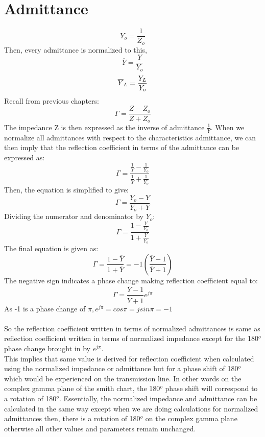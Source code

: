 \section{Admittance}
\begin{equation}
Y_o= \frac{1}{Z_o}
\end{equation}
Then, every admittance is normalized to this,
\begin{equation*}
\overline{Y} = \frac{Y}{Y_o} 
\end{equation*}
\begin{equation*}
\space  \overline{Y}_L = \frac{Y_L}{Y_o}
\end{equation*}
Recall from previous chapters:
\begin{equation*}
\Gamma = \frac{Z-Z_o}{Z+Z_o} 
\end{equation*}
The impedance Z is then expressed as the inverse of admittance $\frac{1}{Y}$. When we normalize all admittances with respect to the characteristics admittance, we can then imply that the reflection coefficient in terms of the admittance can be expressed as:
\begin{equation*}
\Gamma = \frac{\frac{1}{Y} - \frac{1}{Y_o}}{\frac{1}{Y} + \frac{1}{Y_o}}
\end{equation*}
Then, the equation is simplified to give:
\begin{equation}
\Gamma= \frac{Y_o - Y}{Y_o + Y} 
\end{equation}
Dividing the numerator and denominator by $Y_o$:
\begin{equation*}
\Gamma= \frac{1 - \frac{Y}{Y_o}}{1 + \frac{Y}{Y_o}}
\end{equation*}
The final equation is given as:
\begin{equation*}
\Gamma= \frac{1 - \overline{Y}}{1 + \overline{Y}} = -1 (\frac{\overline{Y} - 1}{\overline{Y} + 1}) 
\end{equation*}
The negative sign indicates a phase change making reflection coefficient equal to:
\begin{equation}
\Gamma = \frac{\overline{Y} - 1}{\overline{Y} + 1}e^{j\pi}
\end{equation}
As -1 is a phase change of $\pi, e^{j\pi} = cos\pi = jsin\pi = -1$\\\\
So the reflection coefficient written in terms of normalized admittances is same as reflection coefficient written in terms of normalized impedance except for the 180$^o$ phase change brought in by $e^{j\pi}$.\\
This implies that same value is derived for reflection coefficient when calculated using the normalized impedance or admittance but for a phase shift of 180$^o$ which would be experienced on the transmission line. In other words on the complex gamma plane of the smith chart, the 180$^o$ phase shift will correspond to a rotation of 180$^o$. Essentially, the normalized impedance and admittance can be calculated in the same way except when we are doing calculations for normalized admittances then, there is a rotation of 180$^o$ on the complex gamma plane otherwise all other values and parameters remain unchanged.
